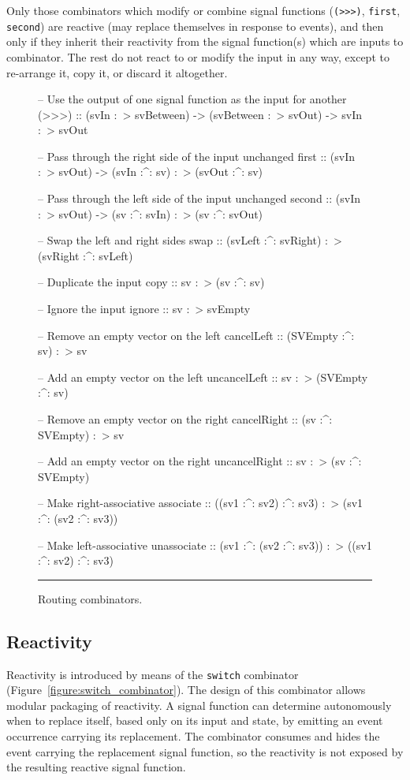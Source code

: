Only those combinators which modify or combine signal functions
({\tt (>>>)}, {\tt first}, {\tt second}) are reactive (may replace themselves in
response to events), and then only if they inherit their reactivity from the
signal function(s) which are inputs to combinator. The rest do not
react to or modify the input in any way, except to re-arrange it, copy it, or
discard it altogether.

\begin{figure}
\begin{code}
-- Use the output of one signal function as the input for another
(>>>) :: (svIn :~> svBetween) -> (svBetween :~> svOut) -> svIn :~> svOut

-- Pass through the right side of the input unchanged
first :: (svIn :~> svOut) -> (svIn :^: sv) :~> (svOut :^: sv)

-- Pass through the left side of the input unchanged
second :: (svIn :~> svOut) -> (sv :^: svIn) :~> (sv :^: svOut)

-- Swap the left and right sides
swap :: (svLeft :^: svRight) :~> (svRight :^: svLeft)

-- Duplicate the input
copy :: sv :~> (sv :^: sv)

-- Ignore the input
ignore :: sv :~> svEmpty

-- Remove an empty vector on the left
cancelLeft :: (SVEmpty :^: sv) :~> sv

-- Add an empty vector on the left
uncancelLeft :: sv :~> (SVEmpty :^: sv)

-- Remove an empty vector on the right
cancelRight :: (sv :^: SVEmpty) :~> sv

-- Add an empty vector on the right
uncancelRight :: sv :~> (sv :^: SVEmpty)

-- Make right-associative
associate :: ((sv1 :^: sv2) :^: sv3) :~> (sv1 :^: (sv2 :^: sv3))

-- Make left-associative
unassociate :: (sv1 :^: (sv2 :^: sv3)) :~> ((sv1 :^: sv2) :^: sv3)
\end{code}
\hrule
\caption{Routing combinators.}
\label{figure:routing_combinators}
\end{figure}

\subsection{Reactivity}
\label{subsection:System_Design_and_Interface-Combinators-Reactivity}

Reactivity is introduced by means of the {\tt switch} combinator
(Figure~\ref{figure:switch_combinator}). The design of this combinator
allows modular packaging of reactivity. A signal function can determine
autonomously when to replace itself, based only on its input and state,
by emitting an event occurrence carrying its replacement. The combinator
consumes and hides the event carrying the replacement signal function, 
so the reactivity is not exposed by the resulting reactive signal function.

